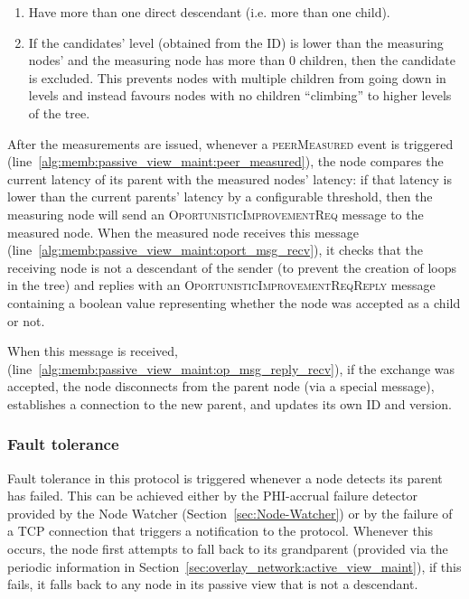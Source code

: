 \begin{enumerate}
    \item Have more than one direct descendant (i.e. more than one child). 
    
    \item If the candidates' level (obtained from the ID) is lower than the measuring nodes' and the measuring node has more than 0 children, then the candidate is excluded. This prevents nodes with multiple children from going down in levels and instead favours nodes with no children ``climbing'' to higher levels of the tree.
\end{enumerate}

After the measurements are issued, whenever a \textsc{peerMeasured} event is triggered (line~\ref{alg:memb:passive_view_maint:peer_measured}), the node compares the current latency of its parent with the measured nodes' latency: if that latency is lower than the current parents' latency by a configurable threshold, then the measuring node will send an \textsc{OportunisticImprovementReq} message to the measured node. When the measured node receives this message (line~\ref{alg:memb:passive_view_maint:oport_msg_recv}), it checks that the receiving node is not a descendant of the sender (to prevent the creation of loops in the tree) and replies with an \textsc{OportunisticImprovementReqReply} message containing a boolean value representing whether the node was accepted as a child or not.

When this message is received, (line~\ref{alg:memb:passive_view_maint:op_msg_reply_recv}), if the exchange was accepted, the node disconnects from the parent node (via a special message), establishes a connection to the new parent, and updates its own ID and version.

\subsubsection{Fault tolerance}

Fault tolerance in this protocol is triggered whenever a node detects its parent has failed. This can be achieved either by the PHI-accrual failure detector provided by the Node Watcher (Section~\ref{sec:Node-Watcher}) or by the failure of a TCP connection that triggers a notification to the protocol. Whenever this occurs, the node first attempts to fall back to its grandparent (provided via the periodic information in Section~\ref{sec:overlay_network:active_view_maint}), if this fails, it falls back to any node in its passive view that is not a descendant.

